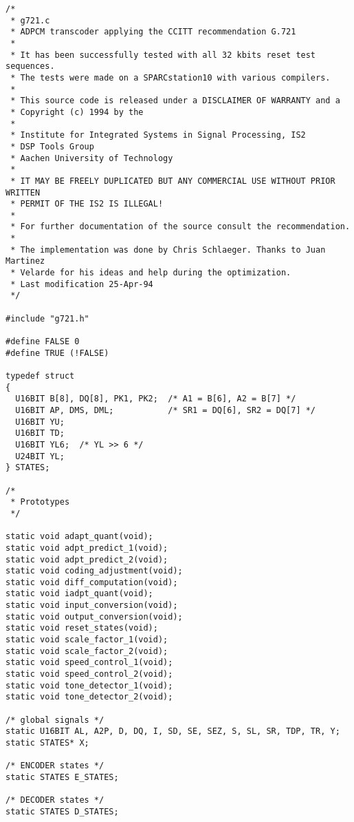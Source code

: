 \begin{verbatim}
/*
 * g721.c
 * ADPCM transcoder applying the CCITT recommendation G.721
 *
 * It has been successfully tested with all 32 kbits reset test sequences.
 * The tests were made on a SPARCstation10 with various compilers.
 *
 * This source code is released under a DISCLAIMER OF WARRANTY and a
 * Copyright (c) 1994 by the
 *
 * Institute for Integrated Systems in Signal Processing, IS2
 * DSP Tools Group
 * Aachen University of Technology
 *
 * IT MAY BE FREELY DUPLICATED BUT ANY COMMERCIAL USE WITHOUT PRIOR WRITTEN
 * PERMIT OF THE IS2 IS ILLEGAL!
 *
 * For further documentation of the source consult the recommendation.
 *
 * The implementation was done by Chris Schlaeger. Thanks to Juan Martinez
 * Velarde for his ideas and help during the optimization.
 * Last modification 25-Apr-94
 */

#include "g721.h"

#define FALSE 0
#define TRUE (!FALSE)

typedef struct
{
  U16BIT B[8], DQ[8], PK1, PK2;  /* A1 = B[6], A2 = B[7] */
  U16BIT AP, DMS, DML;           /* SR1 = DQ[6], SR2 = DQ[7] */
  U16BIT YU;
  U16BIT TD;
  U16BIT YL6;  /* YL >> 6 */
  U24BIT YL;
} STATES;

/*
 * Prototypes
 */

static void adapt_quant(void);
static void adpt_predict_1(void);
static void adpt_predict_2(void);
static void coding_adjustment(void);
static void diff_computation(void);
static void iadpt_quant(void);
static void input_conversion(void);
static void output_conversion(void);
static void reset_states(void);
static void scale_factor_1(void);
static void scale_factor_2(void);
static void speed_control_1(void);
static void speed_control_2(void);
static void tone_detector_1(void);
static void tone_detector_2(void);

/* global signals */
static U16BIT AL, A2P, D, DQ, I, SD, SE, SEZ, S, SL, SR, TDP, TR, Y;
static STATES* X;

/* ENCODER states */
static STATES E_STATES;

/* DECODER states */
static STATES D_STATES;


\end{verbatim}
